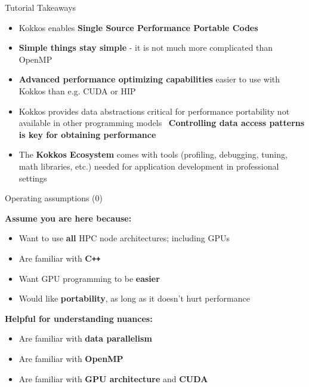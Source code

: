 
\begin{frame}{Tutorial Takeaways}

  \begin{itemize}
  \item {Kokkos enables \textbf{Single Source Performance Portable Codes}}
  \item {\textbf{Simple things stay simple} - it is not much more complicated than OpenMP}
  \item {\textbf{Advanced performance optimizing capabilities} easier to use with Kokkos than e.g. CUDA or HIP}
  \item {Kokkos provides data abstractions critical for performance portability not available in other programming models \
         \textbf{Controlling data access patterns is key for obtaining performance} }
 \item The \textbf{Kokkos Ecosystem} comes with tools (profiling, debugging, tuning, math libraries, etc.) needed for application development in professional settings
  \end{itemize}

\end{frame}


\begin{frame}{Operating assumptions (0)}

  \textbf{Assume you are here because:}
  \begin{itemize}
    \item {Want to use \textbf{all} HPC node architectures; including GPUs}
    \item {Are familiar with \textbf{C\texttt{++}}}
    \item {Want GPU programming to be \textbf{easier}}
    \item {Would like \textbf{portability}, as long as it doesn't hurt performance}
  \end{itemize}
  \textbf{Helpful for understanding nuances:}
  \begin{itemize}
    \item {Are familiar with \textbf{data parallelism}}
    \item {Are familiar with \textbf{OpenMP}}
    \item {Are familiar with \textbf{GPU architecture} and \textbf{CUDA}}
  \end{itemize}

\end{frame}

